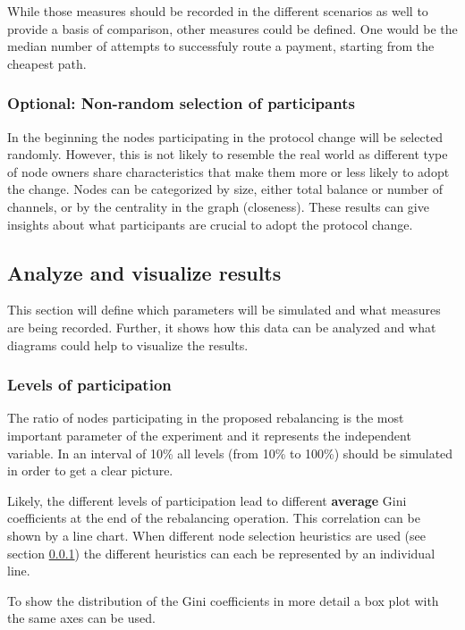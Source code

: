 \documentclass[final]{fhnwreport}       %
\begin{document}
While those measures should be recorded in the different scenarios as well to provide a basis of comparison, other measures could be defined. One would be the median number of attempts to successfuly route a payment, starting from the cheapest path.

\subsubsection{Optional: Non-random selection of participants}\label{sec:selpart}
In the beginning the nodes participating in the protocol change will be selected randomly. However, this is not likely to resemble the real world as different type of node owners share characteristics that make them more or less likely to adopt the change. Nodes can be categorized by size, either total balance or number of channels, or by the centrality in the graph (closeness). These results can give insights about what participants are crucial to adopt the protocol change. 

\subsection{Analyze and visualize results}\label{sec:o_anal}

This section will define which parameters will be simulated and what measures are being recorded. Further, it shows how this data can be analyzed and what diagrams could help to visualize the results.

\subsubsection{Levels of participation}
The ratio of nodes participating in the proposed rebalancing is the most important parameter of the experiment and it represents the independent variable. In an interval of 10\% all levels (from 10\% to 100\%) should be simulated in order to get a clear picture.


Likely, the different levels of participation lead to different \textbf{average} Gini coefficients at the end of the rebalancing operation. This correlation can be shown by a line chart. When different node selection heuristics are used (see section \ref{sec:selpart}) the different heuristics can each be represented by an individual line. 

To show the distribution of the Gini coefficients in more detail a box plot with the same axes can be used.
\end{document}
